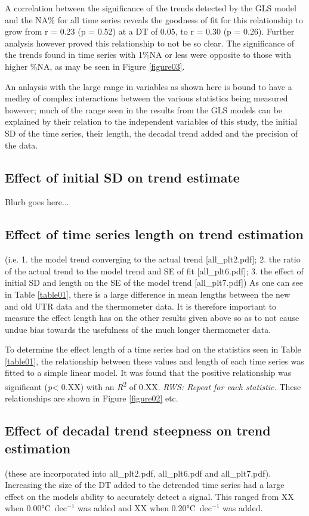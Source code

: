 \documentclass{ametsoc}
\begin{document}
A correlation between the significance of the trends detected by the GLS model and the NA\% for all time series reveals the goodness of fit for this relationship to grow from r = 0.23 (p = 0.52) at a DT of 0.05, to r = 0.30 (p = 0.26). Further analysis however proved this relationship to not be so clear. The significance of the trends found in time series with 1\%NA or less were opposite to those with higher \%NA, as may be seen in Figure \ref{figure03}.

An anlaysis with the large range in variables as shown here is bound to have a medley of complex interactions between the various statistics being measured however; much of the range seen in the results from the GLS models can be explained by their relation to the independent variables of this study, the initial SD of the time series, their length, the decadal trend added and the precision of the data.

\subsection{Effect of initial SD on trend estimate}
Blurb goes here...

\subsection{Effect of time series length on trend estimation}
(i.e. 1. the model trend converging to the actual trend [all_plt2.pdf]; 2. the ratio of the actual trend to the model trend and SE of fit [all_plt6.pdf]; 3. the effect of initial SD and length on the SE of the model trend [all_plt7.pdf])
As one can see in Table \ref{table01}, there is a large difference in mean lengths between the new and old UTR data and the thermometer data. It is therefore important to measure the effect length has on the other results given above so as to not cause undue bias towards the usefulness of the much longer thermometer data.

To determine the effect length of a time series had on the statistics seen in Table \ref{table01}, the relationship between these values and length of each time series was fitted to a simple linear model. It was found that the positive relationship was significant (\emph{p}\num{< 0.XX}) with an \emph{R}\textsuperscript{2} of 0.XX. \emph{RWS: Repeat for each statistic.} These relationships are shown in Figure \ref{figure02} etc.

\subsection{Effect of decadal trend steepness on trend estimation}
(these are incorporated into all_plt2.pdf, all_plt6.pdf and all_plt7.pdf).
Increasing the size of the DT added to the detrended time series had a large effect on the models ability to accurately detect a signal. This ranged from XX when 0.00\si{\degreeCelsius}~dec$^{-1}$ was added and XX when 0.20\si{\degreeCelsius}~dec$^{-1}$ was added.
\end{document}
